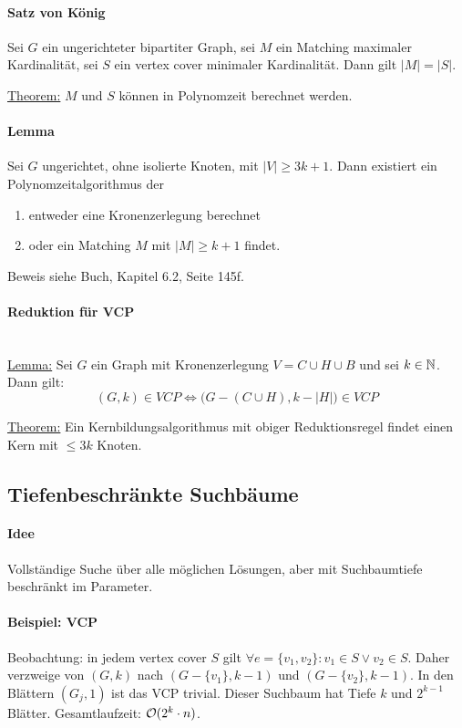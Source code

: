 \paragraph{Satz von König}
Sei $G$ ein ungerichteter bipartiter Graph, sei $M$ ein Matching maximaler Kardinalität,
sei $S$ ein vertex cover minimaler Kardinalität.
Dann gilt $|M| = |S|$.

\underline{Theorem:} $M$ und $S$ können in Polynomzeit berechnet werden.

\paragraph{Lemma}
Sei $G$ ungerichtet, ohne isolierte Knoten, mit $|V| \geq 3k+1$.
Dann existiert ein Polynomzeitalgorithmus der
\begin{enumerate}[label=(\roman*)]
    \item entweder eine Kronenzerlegung berechnet
    \item oder ein Matching $M$ mit $|M| \geq k+1$ findet.
\end{enumerate}
Beweis siehe Buch, Kapitel 6.2, Seite 145f.

\paragraph{Reduktion für VCP} \mbox{} \\
\underline{Lemma:}
Sei $G$ ein Graph mit Kronenzerlegung $V = C \cup H \cup B$ und sei $k \in \mathbb{N}$. Dann gilt: \\
$$ (G, k) \in VCP \iff \Big( G - (C \cup H), k - |H| \Big) \in VCP $$

\underline{Theorem:} Ein Kernbildungsalgorithmus mit obiger Reduktionsregel findet einen Kern mit $\leq 3k$ Knoten.


\subsection{Tiefenbeschränkte Suchbäume}

\paragraph{Idee}
Vollständige Suche über alle möglichen Lösungen, aber mit Suchbaumtiefe beschränkt im Parameter.

\paragraph{Beispiel: VCP}
Beobachtung: in jedem vertex cover $S$ gilt $\forall e = \{v_1, v_2\} : v_1 \in S \vee v_2 \in S$.
Daher verzweige von $(G, k)$ nach $(G-\{v_1\}, k-1)$ und $(G-\{v_2\}, k-1)$.
In den Blättern $(G_j, 1)$ ist das VCP trivial.
Dieser Suchbaum hat Tiefe $k$ und $2^{k-1}$ Blätter.
Gesamtlaufzeit: $\mathcal{O} (2^k \cdot n)$.

